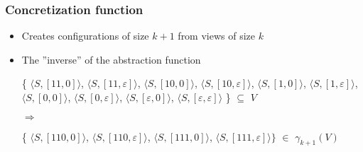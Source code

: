 \documentclass[handout]{beamer}
\begin{document}
\begin{frame}
  \frametitle{Concretization function}
  \begin{itemize}
  \item
    Creates configurations of size $k+1$ from views of size $k$
  \item
    The ''inverse'' of the abstraction function

    \begin{example}[$\gamma$ for ABP with $k=2$]

    \{
    $\langle S, [11, 0]\rangle$,
    {\color{red}$\langle S, [11, \varepsilon]\rangle$},
    $\langle S, [10, 0]\rangle$,
    $\langle S, [10, \varepsilon]\rangle$,
    $\langle S, [1, 0]\rangle$,
    {\color{red}$\langle S, [1,\varepsilon ]\rangle$},
    $\langle S,[0,0]\rangle$,
    $\langle S, [0,\varepsilon]\rangle$,
    $\langle S, [\varepsilon, 0]\rangle$,
    {\color{red}$\langle S, [\varepsilon, \varepsilon]\rangle$}
    \} $\subseteq$ $V$

    $\Rightarrow$

    \{
    $\langle S, [110,0]\rangle$,
    $\langle S, [110,\varepsilon]\rangle$,
    $\langle S, [111,0]\rangle$,
    {\color{red}$\langle S, [111,\varepsilon]\rangle\}$}
    $\in$ $\gamma_{k+1}(V)$
    \end{example}
  \end{itemize}
\end{frame}
\end{document}

